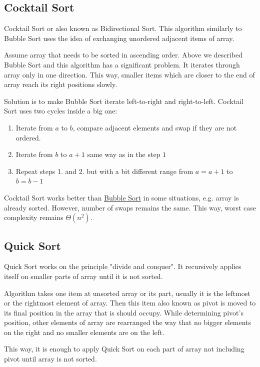 \documentclass[
  field=inf,
  biblatex,
  language=english,
  glossaries,
  theorems=false,
  index
]{kidiplom}
\begin{document}
\subsection{Cocktail Sort}

Cocktail Sort or also known as Bidirectional Sort. This algorithm similarly to Bubble Sort uses the idea of exchanging unordered adjacent items of array. 

Assume array that needs to be sorted in ascending order. Above we described Bubble Sort and this algorithm has a significant problem. It iterates through array only in one direction. This way, smaller items which are closer to the end of array reach its right positions slowly.

Solution is to make Bubble Sort iterate left-to-right and right-to-left. Cocktail Sort uses two cycles inside a big one:

\begin{enumerate}
 \item Iterate from $a$ to $b$, compare adjacent elements and swap if they are not ordered.
 \item Iterate from $b$ to $a + 1$ same way as in the step $1$
 \item Repeat steps 1. and 2. but with a bit different range from $a = a + 1$ to $b = b - 1$
\end{enumerate}

Cocktail Sort works better than \hyperref[sec:bubble]{Bubble Sort} in some situations, e.g. array is already sorted. However, number of swaps remains the same. This way, worst case complexity remains $\Theta(n^2)$.

\subsection{Quick Sort}

Quick Sort works on the principle "divide and conquer". It recursively applies itself on smaller parts of array until it is not sorted.

Algorithm takes one item at unsorted array or its part, usually it is the leftmost or the rightmost element of array. Then this item also known as pivot is moved to its final position in the array that is should occupy. While determining pivot's position, other elements of array are rearranged the way that no bigger elements on the right and no smaller elements are on the left.

This way, it is enough to apply Quick Sort on each part of array not including pivot until array is not sorted.
\end{document}

